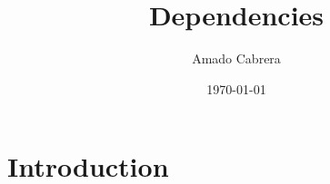 \documentclass{article}
\title{Dependencies}
\author{Amado Cabrera}
\date{\today}
\begin{document}
\maketitle

\section{Introduction}
\end{document}
